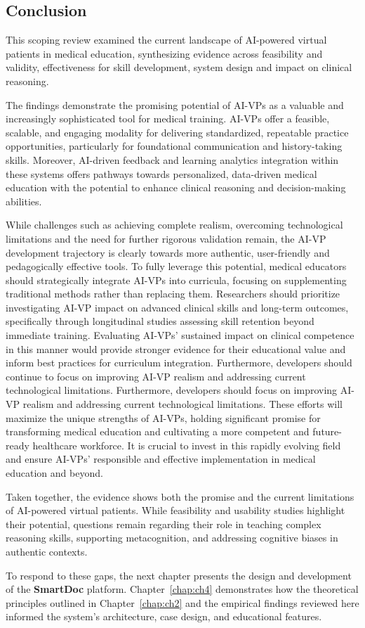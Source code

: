 \subsection*{\textbf{Conclusion}}

This scoping review examined the current landscape of AI-powered virtual patients in medical education, synthesizing evidence across feasibility and validity, effectiveness for skill development, system design and impact on clinical reasoning.

The findings demonstrate the promising potential of AI-VPs as a valuable and increasingly sophisticated tool for medical training. AI-VPs offer a feasible, scalable, and engaging modality for delivering standardized, repeatable practice opportunities, particularly for foundational communication and history-taking skills. Moreover, AI-driven feedback and learning analytics integration within these systems offers pathways towards personalized, data-driven medical education with the potential to enhance clinical reasoning and decision-making abilities.

While challenges such as achieving complete realism, overcoming technological limitations and the need for further rigorous validation remain, the AI-VP development trajectory is clearly towards more authentic, user-friendly and pedagogically effective tools. To fully leverage this potential, medical educators should strategically integrate AI-VPs into curricula, focusing on supplementing traditional methods rather than replacing them. Researchers should prioritize investigating AI-VP impact on advanced clinical skills and long-term outcomes, specifically through longitudinal studies assessing skill retention beyond immediate training. Evaluating AI-VPs’ sustained impact on clinical competence in this manner would provide stronger evidence for their educational value and inform best practices for curriculum integration. Furthermore, developers should continue to focus on improving AI-VP realism and addressing current technological limitations. Furthermore, developers should focus on improving AI-VP realism and addressing current technological limitations. These efforts will maximize the unique strengths of AI-VPs, holding significant promise for transforming medical education and cultivating a more competent and future-ready healthcare workforce. It is crucial to invest in this rapidly evolving field and ensure AI-VPs' responsible and effective implementation in medical education and beyond.

\noindent Taken together, the evidence shows both the promise and the current
limitations of AI-powered virtual patients. While feasibility and usability
studies highlight their potential, questions remain regarding their role in
teaching complex reasoning skills, supporting metacognition, and addressing
cognitive biases in authentic contexts. 

To respond to these gaps, the next chapter presents the design and development
of the \textbf{SmartDoc} platform. Chapter~\ref{chap:ch4} demonstrates how the
theoretical principles outlined in Chapter~\ref{chap:ch2} and the empirical
findings reviewed here informed the system’s architecture, case design, and
educational features.